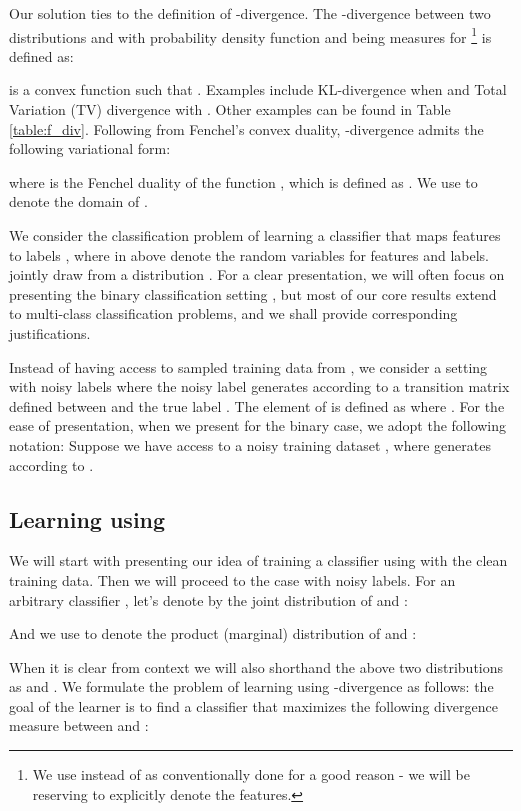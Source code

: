 \documentclass{article}
\begin{document}
Our solution ties to the definition of -divergence. The -divergence between two distributions  and  with probability density function  and  being measures for \footnote{We use  instead of  as conventionally done for a good reason - we will be reserving  to explicitly denote the features.} is defined as: 

 is a convex function such that . Examples include KL-divergence when  and Total Variation (TV) divergence with . Other examples can be found in Table \ref{table:f_div}. 
Following from Fenchel's convex duality, -divergence admits the following variational form:

where  is the Fenchel duality of the function , which is defined as . We use  to denote the domain of .

We consider the classification problem of learning a classifier  that maps features  to labels , where in above  denote the random variables for features and labels.  jointly draw from a distribution . For a clear presentation, we will often focus on presenting the binary classification setting , but most of our core results extend to multi-class classification problems, and we shall provide corresponding justifications. 

Instead of having access to sampled training data from , we consider a setting  with noisy labels where the noisy label  generates according to a transition matrix  defined between  and the true label . The  element of  is defined as  where . For the ease of presentation, when we present for the binary case, we adopt the following notation:
 Suppose we have access to a noisy training dataset , where  generates according to .


\subsection{Learning using }


We will start with presenting our idea of training a classifier using  with the clean training data. Then we will proceed to the case with noisy labels. For an arbitrary classifier , let's denote by  the joint distribution of  and :

And we use  to denote the product (marginal) distribution of  and :

When it is clear from context we will also shorthand the above two distributions as  and . We formulate the problem of learning using -divergence as follows: the goal of the learner is to find a classifier  that maximizes the following divergence measure between  and :
\end{document}
